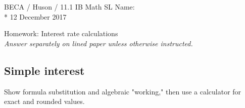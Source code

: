 \documentclass[]{book}
\begin{document}
\noindent BECA / Huson / 11.1 IB Math SL \hspace{2in} Name:\\*
12 December 2017
\begin{center}
{\Large Homework: Interest rate calculations}\\
\textit{Answer separately on lined paper unless otherwise instructed.}
\end{center}

\subsection*{Simple interest}


Show formula substitution and algebraic "working," then use a calculator for exact and rounded values.
\end{document}
